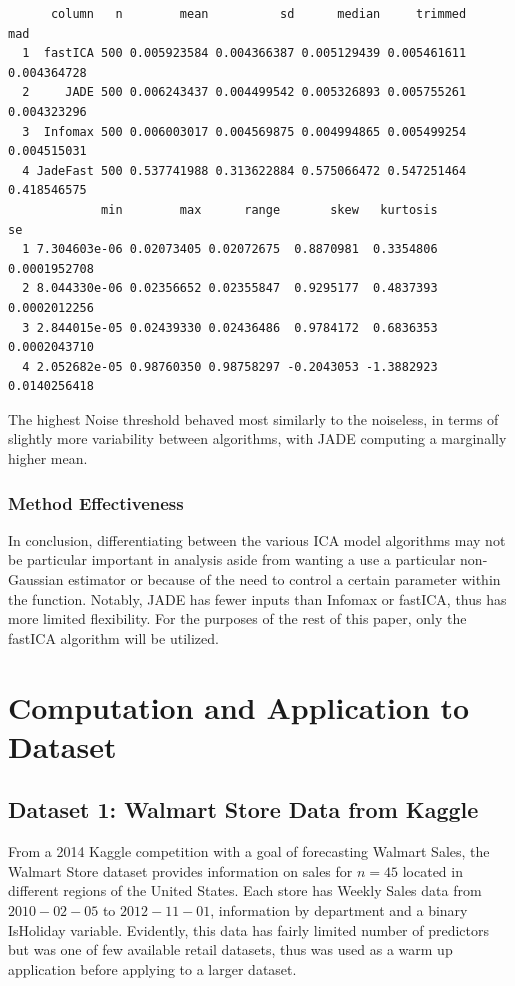 \documentclass[12pt,twoside]{amherstthesis}
\begin{document}
  \begin{verbatim}
      column   n        mean          sd      median     trimmed         mad
  1  fastICA 500 0.005923584 0.004366387 0.005129439 0.005461611 0.004364728
  2     JADE 500 0.006243437 0.004499542 0.005326893 0.005755261 0.004323296
  3  Infomax 500 0.006003017 0.004569875 0.004994865 0.005499254 0.004515031
  4 JadeFast 500 0.537741988 0.313622884 0.575066472 0.547251464 0.418546575
             min        max      range       skew   kurtosis           se
  1 7.304603e-06 0.02073405 0.02072675  0.8870981  0.3354806 0.0001952708
  2 8.044330e-06 0.02356652 0.02355847  0.9295177  0.4837393 0.0002012256
  3 2.844015e-05 0.02439330 0.02436486  0.9784172  0.6836353 0.0002043710
  4 2.052682e-05 0.98760350 0.98758297 -0.2043053 -1.3882923 0.0140256418
  \end{verbatim}
  
  The highest Noise threshold behaved most similarly to the noiseless, in
  terms of slightly more variability between algorithms, with JADE
  computing a marginally higher mean.
  
  \subsection{Method Effectiveness}\label{method-effectiveness}
  
  In conclusion, differentiating between the various ICA model algorithms
  may not be particular important in analysis aside from wanting a use a
  particular non-Gaussian estimator or because of the need to control a
  certain parameter within the function. Notably, JADE has fewer inputs
  than Infomax or fastICA, thus has more limited flexibility. For the
  purposes of the rest of this paper, only the fastICA algorithm will be
  utilized.
  
  \chapter{Computation and Application to
  Dataset}\label{computation-and-application-to-dataset}
  
  \section{Dataset 1: Walmart Store Data from
  Kaggle}\label{dataset-1-walmart-store-data-from-kaggle}
  
  From a 2014 Kaggle competition with a goal of forecasting Walmart Sales,
  the Walmart Store dataset provides information on sales for \(n=45\)
  located in different regions of the United States. Each store has Weekly
  Sales data from \(2010-02-05\) to \(2012-11-01\), information by
  department and a binary IsHoliday variable. Evidently, this data has
  fairly limited number of predictors but was one of few available retail
  datasets, thus was used as a warm up application before applying to a
  larger dataset.
  
\end{document}
